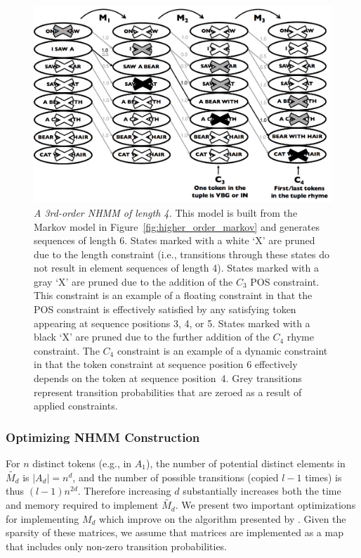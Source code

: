 \documentclass[phd,electronic,oneside,twosidetoc,letterpaper,chaptercenter,parttop,lof,lot]{byumsphd}
\begin{document}
\begin{figure}
\centering
\includegraphics[width=.8\linewidth]{higher_order_nhm}
\caption{\textit{A 3rd-order NHMM of length 4.} This model is built from the Markov model in Figure~\ref{fig:higher_order_markov} and generates sequences of length 6. States marked with a white `X' are pruned due to the length constraint (i.e., transitions through these states do not result in element sequences of length 4). States marked with a gray `X' are pruned due to the addition of the $C_3$ POS constraint. This constraint is an example of a floating constraint in that the POS constraint is effectively satisfied by any satisfying token appearing at sequence positions 3, 4, or 5. States marked with a black `X' are pruned due to the further addition of the $C_4$ rhyme constraint. The $C_4$ constraint is an example of a dynamic constraint in that the token constraint at sequence position 6 effectively depends on the token at sequence position~4. Grey transitions represent transition probabilities that are zeroed as a result of applied constraints.}
\label{fig:higher_order_nhmm}
\end{figure}

\subsubsection{Optimizing NHMM Construction}

For $n$ distinct tokens (e.g., in $A_1$), the number of potential distinct elements in $\tilde{M_d}$ is $|A_d| = n^d$, and the number of possible transitions (copied $l-1$ times) is thus $(l-1)n^{2d}$. Therefore increasing $d$ substantially increases both the time and memory required to implement $\tilde{M_d}$. We present two important optimizations for implementing $M_d$ which improve on the algorithm presented by \citeauthor{pachet2011finite} \cite{pachet2011finite}. Given the sparsity of these matrices, we assume that matrices are implemented as a map that includes only non-zero transition probabilities.
\end{document}
